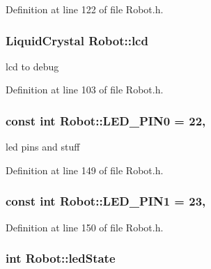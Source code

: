 Definition at line 122 of file Robot.\-h.

\hypertarget{classRobot_aa2182958e636a5b3e0383643a48ca6f8}{
\subsubsection[{lcd}]{\setlength{\rightskip}{0pt plus 5cm}Liquid\-Crystal Robot\-::lcd}}\label{classRobot_aa2182958e636a5b3e0383643a48ca6f8}


lcd to debug 



Definition at line 103 of file Robot.\-h.

\hypertarget{classRobot_a431ea8916b52ddfddbe6d80a09fe71e0}{
\subsubsection[{L\-E\-D\-\_\-\-P\-I\-N0}]{\setlength{\rightskip}{0pt plus 5cm}const int Robot\-::\-L\-E\-D\-\_\-\-P\-I\-N0 = 22\hspace{0.3cm}{\ttfamily [static]}, {\ttfamily [private]}}}\label{classRobot_a431ea8916b52ddfddbe6d80a09fe71e0}
led pins and stuff 

Definition at line 149 of file Robot.\-h.

\hypertarget{classRobot_a4c6f4e38b77bf470d757ebea1b8c3cf0}{
\subsubsection[{L\-E\-D\-\_\-\-P\-I\-N1}]{\setlength{\rightskip}{0pt plus 5cm}const int Robot\-::\-L\-E\-D\-\_\-\-P\-I\-N1 = 23\hspace{0.3cm}{\ttfamily [static]}, {\ttfamily [private]}}}\label{classRobot_a4c6f4e38b77bf470d757ebea1b8c3cf0}


Definition at line 150 of file Robot.\-h.

\hypertarget{classRobot_a3c7308c71db125a8840f9c82b5fec9ca}{
\subsubsection[{led\-State}]{\setlength{\rightskip}{0pt plus 5cm}int Robot\-::led\-State\hspace{0.3cm}{\ttfamily [private]}}}\label{classRobot_a3c7308c71db125a8840f9c82b5fec9ca}


